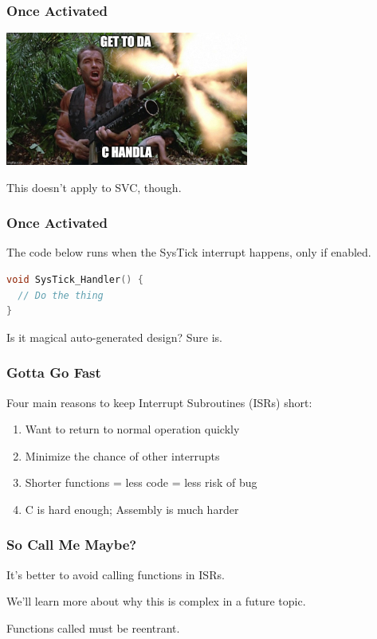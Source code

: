 \begin{frame}
\frametitle{Once Activated}

\begin{center}
	\includegraphics[width=0.6\textwidth]{images/choppa.jpg}
\end{center}

This doesn't apply to SVC, though. 

\end{frame}

\begin{frame}[fragile]
\frametitle{Once Activated}

The code below runs when the SysTick interrupt happens, only if enabled.

\begin{lstlisting}[language=C]
void SysTick_Handler() {
  // Do the thing
}
\end{lstlisting}

Is it magical auto-generated design? Sure is.

\end{frame}

\begin{frame}
\frametitle{Gotta Go Fast}

Four main reasons to keep \alert{Interrupt Subroutines (ISRs)} short:

\begin{enumerate}
	\item Want to return to normal operation quickly
	\item Minimize the chance of other interrupts
	\item Shorter functions = less code = less risk of bug
	\item C is hard enough; Assembly is much harder
\end{enumerate}

\end{frame}

\begin{frame}
\frametitle{So Call Me Maybe?}

It's better to avoid calling functions in ISRs.

We'll learn more about why this is complex in a future topic. 

Functions called must be \alert{reentrant}. 

\end{frame}

